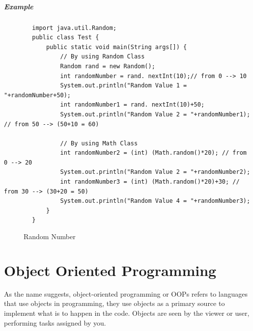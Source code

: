 \documentclass[openany]{book}  %
\begin{document}
\subsubsection{Example}
\begin{center}
    \begin{verbatim}
        import java.util.Random;
        public class Test {
            public static void main(String args[]) {
                // By using Random Class
                Random rand = new Random();
                int randomNumber = rand. nextInt(10);// from 0 --> 10
                System.out.println("Random Value 1 = "+randomNumber+50);
                int randomNumber1 = rand. nextInt(10)+50;
                System.out.println("Random Value 2 = "+randomNumber1); // from 50 --> (50+10 = 60)

                // By using Math Class
                int randomNumber2 = (int) (Math.random()*20); // from 0 --> 20
                System.out.println("Random Value 2 = "+randomNumber2); 
                int randomNumber3 = (int) (Math.random()*20)+30; // from 30 --> (30+20 = 50)
                System.out.println("Random Value 4 = "+randomNumber3); 
            }
        }
    \end{verbatim}
\end{center}
% 
% 
\begin{figure}[htbp]
    \begin{center}
        \caption{Random Number}
    \end{center}
\end{figure}
% 
% 
\part{Object Oriented Programming}
As the name suggests, object-oriented programming or
OOPs refers to languages that use objects in programming,
they use objects as a primary source to implement what is to happen in the code.
Objects are seen by the viewer or user, performing tasks assigned by you.
% 
% 
\end{document}
